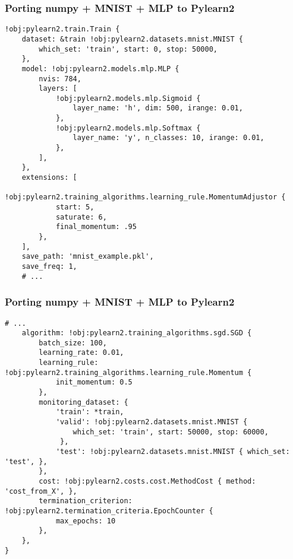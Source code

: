 \documentclass[mathserif, xcolor=dvipsnames]{beamer}
\begin{document}
\begin{frame}[fragile]
    \frametitle{Porting numpy + MNIST + MLP to Pylearn2}

    \begin{examples}
\begin{lstlisting}[caption=YAML version of the previous code]
!obj:pylearn2.train.Train {
    dataset: &train !obj:pylearn2.datasets.mnist.MNIST {
        which_set: 'train', start: 0, stop: 50000,
    },
    model: !obj:pylearn2.models.mlp.MLP {
        nvis: 784,
        layers: [
            !obj:pylearn2.models.mlp.Sigmoid {
                layer_name: 'h', dim: 500, irange: 0.01,
            },
            !obj:pylearn2.models.mlp.Softmax {
                layer_name: 'y', n_classes: 10, irange: 0.01,
            },
        ],
    },
    extensions: [
        !obj:pylearn2.training_algorithms.learning_rule.MomentumAdjustor {
            start: 5,
            saturate: 6,
            final_momentum: .95
        },
    ],
    save_path: 'mnist_example.pkl',
    save_freq: 1,
    # ...
\end{lstlisting}
    \end{examples}
\end{frame}

\begin{frame}[fragile]
    \frametitle{Porting numpy + MNIST + MLP to Pylearn2}

    \begin{examples}
\begin{lstlisting}[caption=YAML version of the previous code (continued)]
    # ...
    algorithm: !obj:pylearn2.training_algorithms.sgd.SGD {
        batch_size: 100,
        learning_rate: 0.01,
        learning_rule: !obj:pylearn2.training_algorithms.learning_rule.Momentum {
            init_momentum: 0.5
        },
        monitoring_dataset: {
            'train': *train,
            'valid': !obj:pylearn2.datasets.mnist.MNIST {
                which_set: 'train', start: 50000, stop: 60000,
             },
            'test': !obj:pylearn2.datasets.mnist.MNIST { which_set: 'test', },
        },
        cost: !obj:pylearn2.costs.cost.MethodCost { method: 'cost_from_X', },
        termination_criterion: !obj:pylearn2.termination_criteria.EpochCounter {
            max_epochs: 10
        },
    },
}
\end{lstlisting}
    \end{examples}
\end{frame}
\end{document}
